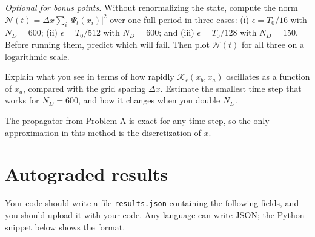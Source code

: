 \begin{solution}
\end{solution}

\begin{problem}[10]
  \emph{Optional for bonus points.}
  Without renormalizing the state, compute the norm $\mathcal N(t) = \Delta x \sum_i |\Psi_t(x_i)|^2$ over one full period in three cases:
  (i) $\epsilon = T_0/16$ with $N_D = 600$;
  (ii) $\epsilon = T_0/512$ with $N_D = 600$; and
  (iii) $\epsilon = T_0/128$ with $N_D = 150$.
  Before running them, predict which will fail.
  Then plot $\mathcal N(t)$ for all three on a logarithmic scale.

  Explain what you see in terms of how rapidly $\mathcal K_\epsilon(x_b, x_a)$ oscillates as a function of $x_a$, compared with the grid spacing $\Delta x$.
  Estimate the smallest time step that works for $N_D = 600$, and how it changes when you double $N_D$.

  \begin{hint}
    The propagator from Problem A is exact for any time step, so the only approximation in this method is the discretization of $x$.
  \end{hint}
\end{problem}

\begin{solution}
\end{solution}

\section*{Autograded results}
Your code should write a file \texttt{results.json} containing the following fields, and you should upload it with your code.
Any language can write JSON; the Python snippet below shows the format.

